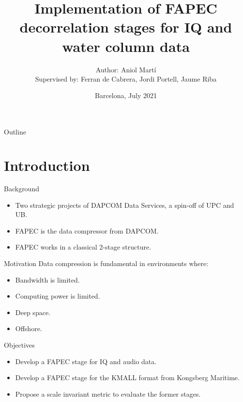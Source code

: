 \documentclass[usenames,dvipsnames]{beamer}
\title[FAPEC]{Implementation of FAPEC decorrelation stages for IQ and water column data}
\date[July 2021]{Barcelona, July 2021}
\author[Aniol Martí]{
  Author: Aniol Martí\\
  Supervised by: Ferran de Cabrera, Jordi Portell, Jaume Riba
}
\institute{Universitat Politècnica de Catalunya}
\begin{document}
\begin{frame}
\titlepage
\end{frame}

\begin{frame}{Outline}
\tableofcontents
\end{frame}


\section{Introduction}
\begin{frame}{Background}
\begin{itemize}
	\item<1-> Two strategic projects of DAPCOM Data Services, a spin-off of UPC and UB.
	\item<2-> FAPEC is the data compressor from DAPCOM.
	\item<3-> FAPEC works in a classical 2-stage structure.
\end{itemize}
\vspace{1.5em}
\centering
{}\scalebox{.515}{}
\end{frame}

\begin{frame}{Motivation}
Data compression is fundamental in environments where:
\begin{itemize}
	\item<2-> Bandwidth is limited.
	\item<3-> Computing power is limited.
\end{itemize}
\vspace{1em}

\begin{itemize}
	\item<5-> Deep space.
	\item<6-> Offshore.
\end{itemize}
\end{frame}

\begin{frame}{Objectives}
\begin{itemize}
	\item<1-> Develop a FAPEC stage for IQ and audio data.
	\item<2-> Develop a FAPEC stage for the KMALL format from Kongsberg Maritime.
	\item<3-> Propose a scale invariant metric to evaluate the former stages. 
\end{itemize}
\end{frame}
\end{document}
